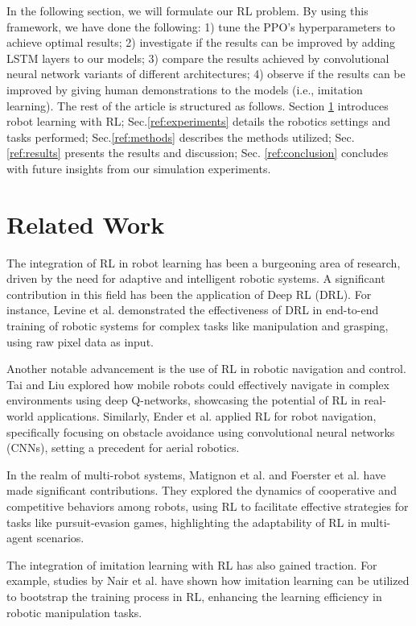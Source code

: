 \documentclass{article}
\begin{document}
In the following section, we will formulate our RL problem. By using this framework, we have done the following: 1) tune the PPO’s hyperparameters to achieve optimal results; 2) investigate if the results can be improved by adding LSTM layers to our models; 3) compare the results achieved by convolutional neural network variants of different architectures; 4) observe if the results can be improved by giving human demonstrations to the models (i.e., imitation learning). The rest of the article is structured as follows. Section \ref{ref:relatedwork} introduces robot learning with RL; Sec.\ref{ref:experiments} details the robotics settings and tasks performed; Sec.\ref{ref:methods} describes the methods utilized; Sec. \ref{ref:results} presents the results and discussion; Sec. \ref{ref:conclusion} concludes with future insights from our simulation experiments.

\section{Related Work}
\label{ref:relatedwork}
The integration of RL in robot learning has been a burgeoning area of research, driven by the need for adaptive and intelligent robotic systems. A significant contribution in this field has been the application of Deep RL (DRL). For instance, Levine et al. \cite{levine2016end} demonstrated the effectiveness of DRL in end-to-end training of robotic systems for complex tasks like manipulation and grasping, using raw pixel data as input.

Another notable advancement is the use of RL in robotic navigation and control. Tai and Liu \cite{tai2017virtual} explored how mobile robots could effectively navigate in complex environments using deep Q-networks, showcasing the potential of RL in real-world applications. Similarly, Ender et al. \cite{cetin2019drone} applied RL for robot navigation, specifically focusing on obstacle avoidance using convolutional neural networks (CNNs), setting a precedent for aerial robotics.

In the realm of multi-robot systems, Matignon et al. \cite{matignon2012coordinated} and Foerster et al. \cite{foerster2016learning} have made significant contributions. They explored the dynamics of cooperative and competitive behaviors among robots, using RL to facilitate effective strategies for tasks like pursuit-evasion games, highlighting the adaptability of RL in multi-agent scenarios.

The integration of imitation learning with RL has also gained traction. For example, studies by Nair et al. \cite{nair2018overcoming} have shown how imitation learning can be utilized to bootstrap the training process in RL, enhancing the learning efficiency in robotic manipulation tasks.
\end{document}
